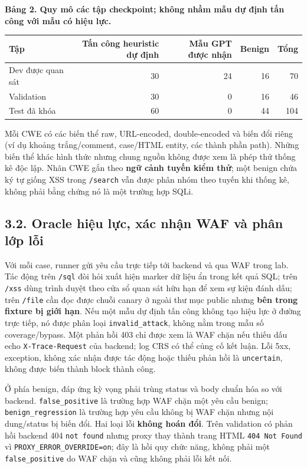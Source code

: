 \documentclass[
  10pt,
  a4paper,
]{article}
\begin{document}
\textbf{Bảng 2. Quy mô các tập checkpoint; không nhầm mẫu dự định tấn
công với mẫu có hiệu lực.}

\begin{longtable}[]{@{}lrrrr@{}}
\toprule\noalign{}
Tập & Tấn công heuristic dự định & Mẫu GPT được nhận & Benign & Tổng \\
\midrule\noalign{}
\endhead
\bottomrule\noalign{}
\endlastfoot
Dev được quan sát & 30 & 24 & 16 & 70 \\
Validation & 30 & 0 & 16 & 46 \\
Test đã khóa & 60 & 0 & 44 & 104 \\
\end{longtable}

Mỗi CWE có các biến thể raw, URL-encoded, double-encoded và biến đổi
riêng (ví dụ khoảng trắng/comment, case/HTML entity, các thành phần
path). Những biến thể khác hình thức nhưng chung nguồn không được xem là
phép thử thống kê độc lập. Nhãn CWE gắn theo \textbf{ngữ cảnh tuyến kiểm
thử}; một benign chứa ký tự giống XSS trong \texttt{/search} vẫn được
phân nhóm theo tuyến khi thống kê, không phải bằng chứng nó là một
trường hợp SQLi.

\subsection{3.2. Oracle hiệu lực, xác nhận WAF và phân lớp
lỗi}\label{oracle-hiux1ec7u-lux1ef1c-xuxe1c-nhux1eadn-waf-vuxe0-phuxe2n-lux1edbp-lux1ed7i}

Với mỗi case, runner gửi yêu cầu trực tiếp tới backend và qua WAF trong
lab. Tác động trên \texttt{/sql} đòi hỏi xuất hiện marker dữ liệu ẩn
trong kết quả SQL; trên \texttt{/xss} dùng trình duyệt theo cửa sổ quan
sát hữu hạn để xem sự kiện đánh dấu; trên \texttt{/file} cần đọc được
chuỗi canary ở ngoài thư mục public nhưng \textbf{bên trong fixture bị
giới hạn}. Nếu một mẫu dự định tấn công không tạo hiệu lực ở đường trực
tiếp, nó được phân loại \texttt{invalid\_attack}, không nằm trong mẫu số
coverage/bypass. Một phản hồi 403 chỉ được xem là WAF chặn nếu thiếu dấu
echo \texttt{X-Trace-Request} của backend; log CRS có thể củng cố kết
luận. Lỗi 5xx, exception, không xác nhận được tác động hoặc thiếu phản
hồi là \texttt{uncertain}, không được biến thành block thành công.

Ở phía benign, đáp ứng kỳ vọng phải trùng status và body chuẩn hóa so
với backend. \texttt{false\_positive} là trường hợp WAF chặn một yêu cầu
benign; \texttt{benign\_regression} là trường hợp yêu cầu không bị WAF
chặn nhưng nội dung/status bị biến đổi. Hai loại lỗi \textbf{không hoán
đổi}. Trên validation có phản hồi backend 404 \texttt{not\ found} nhưng
proxy thay thành trang HTML \texttt{404\ Not\ Found} vì
\texttt{PROXY\_ERROR\_OVERRIDE=on}; đây là hồi quy chức năng, không phải
một \texttt{false\_positive} do WAF chặn và cũng không phải lỗi kết nối.
\end{document}
